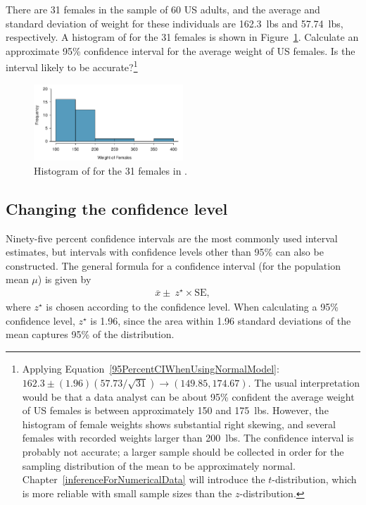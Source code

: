   \begin{exercise} \label{95CIExerciseForWeightUSFemales}
    There are 31 females in the sample of 60 US adults, and the average and standard deviation of weight for these individuals are 162.3~lbs and 57.74~lbs, respectively.  A histogram of  for the 31 females is shown in Figure~\ref{cdcFemaleWeightHist}.  Calculate an approximate 95\% confidence interval for the average weight of US females.  Is the interval likely to be accurate?\footnote{Applying Equation~\ref{95PercentCIWhenUsingNormalModel}: $162.3  \pm (1.96)(57.73/\sqrt{31}) \rightarrow (149.85, 174.67)$.  The usual interpretation would be that a data analyst can be about 95\% confident the average weight of US females is between approximately 150 and 175~lbs.  However, the histogram of female weights shows substantial right skewing, and several females with recorded weights larger than 200~lbs. The confidence interval is probably not accurate; a larger sample should be collected in order for the sampling distribution of the mean to be approximately normal.  Chapter~\ref{inferenceForNumericalData} will introduce the $t$-distribution, which is more reliable with small sample sizes than the $z$-distribution.}
\end{exercise}

\begin{figure}[hht]
   \centering
   \includegraphics[width=0.5\textwidth]
{ch_inference_foundations_oi_biostat/figures/cdcFemaleWeightHistogram/cdcFemaleWeightHistogram.pdf}
\caption{Histogram of  for the 31 females in .}
\label{cdcFemaleWeightHist}
\end{figure}


\subsection{Changing the confidence level}
\label{changingTheConfidenceLevelSection}


Ninety-five percent confidence intervals are the most commonly used interval estimates, but intervals with confidence levels other than 95\% can also be constructed. The general formula for a confidence interval (for the population mean $\mu$) is given by 
\begin{align}
	\overline{x} \pm \ z^{\star} \times \text{SE},
\end{align}
where $z^{\star}$ is chosen according to the confidence level. When calculating a 95\% confidence level, $z^{\star}$ is 1.96, since the area within 1.96 standard deviations of the mean captures 95\% of the distribution.

